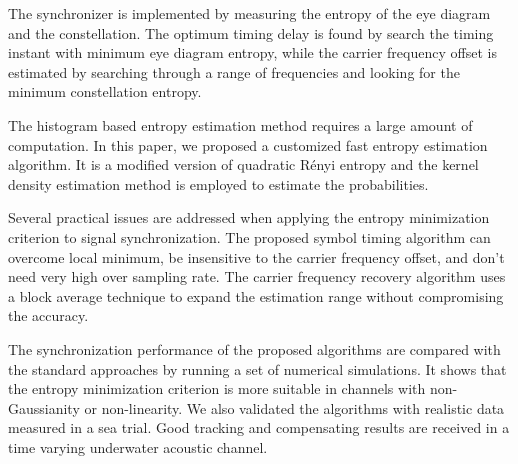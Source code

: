 \documentclass[journal,comsoc]{IEEEtran}
\begin{document}
The synchronizer is implemented by measuring the entropy of the eye diagram and the constellation.
The optimum timing delay is found by search the timing instant with minimum eye diagram entropy, while the carrier frequency offset is estimated by searching through a range of frequencies and looking for the minimum constellation entropy.  

The histogram based entropy estimation method requires a large amount of computation.
In this paper, we proposed a customized fast entropy estimation algorithm.
It is a modified version of quadratic R\'enyi entropy and the kernel density estimation method is employed to estimate the probabilities.

Several practical issues are addressed when applying the entropy minimization criterion to signal synchronization.
The proposed symbol timing algorithm can overcome local minimum, be insensitive to the carrier frequency offset, and don't need very high over sampling rate.
The carrier frequency recovery algorithm uses a block average technique to expand the estimation range without compromising the accuracy. 

The synchronization performance of the proposed algorithms are compared with the standard approaches by running a set of numerical simulations.
It shows that the entropy minimization criterion is more suitable in channels with  non-Gaussianity or non-linearity.
We also validated the algorithms with realistic data measured in a sea trial.
Good tracking and compensating results are received in a time varying underwater acoustic channel.


\end{document}
